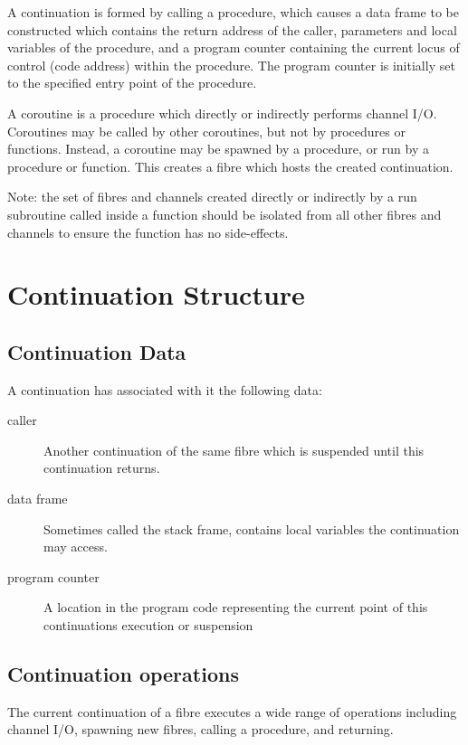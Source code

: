 \documentclass{article}
\begin{document}
A continuation is formed by calling a procedure,
which causes a data frame to be constructed which
contains the return address of the caller,
parameters and local variables of the procedure,
and a program counter containing the current
locus of control (code address) within the procedure.
The program counter is initially set to the specified
entry point of the procedure.

A coroutine is a procedure which directly or indirectly
performs channel I/O. Coroutines may be called by 
other coroutines, but not by procedures or functions.
Instead, a coroutine may be spawned by a procedure,
or run by a procedure or function. This creates a
fibre which hosts the created continuation.

Note: the set of fibres and channels created directly
or indirectly by a run subroutine called inside
a function should be isolated from all other fibres
and channels to ensure the function has no side-effects.



\section{Continuation Structure}
\subsection{Continuation Data}
A continuation has associated with it the following
data:

\begin{description}
\item[caller] Another continuation of the same fibre which is
suspended until this continuation returns.
\item[data frame] Sometimes called the stack frame, contains
local variables the continuation may access.
\item[program counter] A location in the program code representing
the current point of this continuations execution or suspension
\end{description}

\subsection{Continuation operations}
The current continuation of a fibre executes a wide range of
operations including channel I/O, spawning new fibres,
calling a procedure, and returning.
\end{document}
